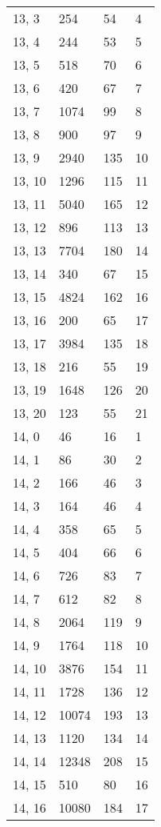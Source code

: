 \begin{table}
\begin{tabular}{llll}
13, 3  &     254 &   54 &     4 \\
13, 4  &     244 &   53 &     5 \\
13, 5  &     518 &   70 &     6 \\
13, 6  &     420 &   67 &     7 \\
13, 7  &    1074 &   99 &     8 \\
13, 8  &     900 &   97 &     9 \\
13, 9  &    2940 &  135 &    10 \\
13, 10 &    1296 &  115 &    11 \\
13, 11 &    5040 &  165 &    12 \\
13, 12 &     896 &  113 &    13 \\
13, 13 &    7704 &  180 &    14 \\
13, 14 &     340 &   67 &    15 \\
13, 15 &    4824 &  162 &    16 \\
13, 16 &     200 &   65 &    17 \\
13, 17 &    3984 &  135 &    18 \\
13, 18 &     216 &   55 &    19 \\
13, 19 &    1648 &  126 &    20 \\
13, 20 &     123 &   55 &    21 \\
14, 0  &      46 &   16 &     1 \\
14, 1  &      86 &   30 &     2 \\
14, 2  &     166 &   46 &     3 \\
14, 3  &     164 &   46 &     4 \\
14, 4  &     358 &   65 &     5 \\
14, 5  &     404 &   66 &     6 \\
14, 6  &     726 &   83 &     7 \\
14, 7  &     612 &   82 &     8 \\
14, 8  &    2064 &  119 &     9 \\
14, 9  &    1764 &  118 &    10 \\
14, 10 &    3876 &  154 &    11 \\
14, 11 &    1728 &  136 &    12 \\
14, 12 &   10074 &  193 &    13 \\
14, 13 &    1120 &  134 &    14 \\
14, 14 &   12348 &  208 &    15 \\
14, 15 &     510 &   80 &    16 \\
14, 16 &   10080 &  184 &    17 \\

\end{tabular}
\end{table}
